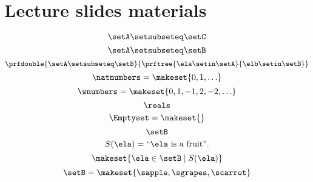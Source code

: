 
\section{Lecture slides materials}

\begin{forslides}
\begin{equation}
        \label{eq:subset_session1_testing_22}
        \setA \setsubseteq \setC
    \end{equation}
    \begin{equation}
        \label{eq:subset_session1_22}
        \setA \setsubseteq \setB
    \end{equation}
    \begin{equation}
        \label{eq:subset_2_session1_22}
        \prfdouble{\setA \setsubseteq \setB}{\prftree{\ela \setin \setA}{\elb \setin \setB}}
    \end{equation}
    \begin{equation}
        \label{eq:nats_session1_22}
        \natnumbers =\makeset{0,1,\ldots}
    \end{equation}
    \begin{equation}
        \label{eq:reals_session1_22}
        \wnumbers =\makeset{0,1,-1,2,-2,\ldots}
    \end{equation}
    \begin{equation}
        \label{eq:reals_2_session1_22}
        \reals
    \end{equation}
    \begin{equation}
        \label{eq:emptyset_session1_22}
        \Emptyset=\makeset{}
    \end{equation}
    \begin{equation}
        \label{eq:stat_1_session1_22}
        \setB
    \end{equation}
    \begin{equation}
        \label{eq:stat_2_session1_22}
        S(\ela) = \text{``$\ela$ is a fruit''}.
    \end{equation}
    \begin{equation}
        \label{eq:stat_3_session1_22}
        \makeset{\ela \in \setB \mid S(\ela)}
    \end{equation}
    \begin{equation}
        \label{eq:stat_4_session1_22}
        \setB=\makeset{\sapple, \sgrapes, \scarrot}
    \end{equation}
    \begin{equation}

\end{equation}
\end{forslides}
